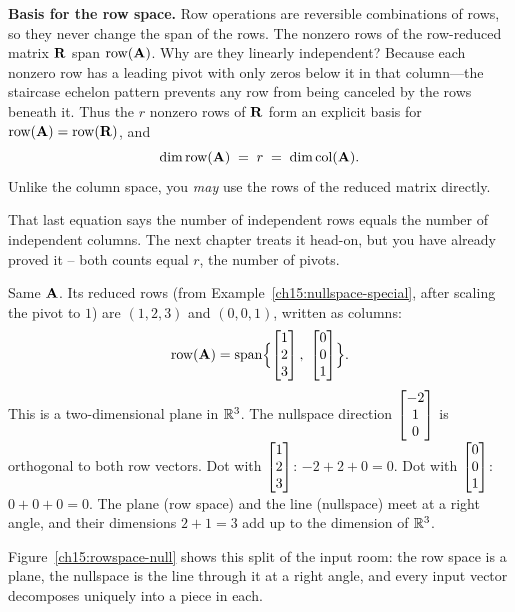 \begin{formalbox}
\textbf{Basis for the row space.} Row operations are reversible combinations of rows, so they
never change the span of the rows. The nonzero rows of the row-reduced matrix $\mat{R}$ span
$\row(\mat{A})$. Why are they linearly independent? Because each nonzero row has a leading pivot
with only zeros below it in that column---the staircase echelon pattern prevents any row from being
canceled by the rows beneath it. Thus the $r$ nonzero rows of $\mat{R}$ form an explicit basis for
$\row(\mat{A})=\row(\mat{R})$, and
\[
  \dimn \row(\mat{A}) \;=\; r \;=\; \dimn\col(\mat{A}).
\]
Unlike the column space, you \emph{may} use the rows of the reduced matrix directly.
\end{formalbox}

That last equation says the number of independent rows equals the number of
independent columns. The next chapter treats it head-on, but you have already
proved it -- both counts equal $r$, the number of pivots.

\begin{example}\label{ch15:rowspace}
Same $\mat{A}$. Its reduced rows (from Example~\ref{ch15:nullspace-special}, after scaling the
pivot to $1$) are $(1,2,3)$ and $(0,0,1)$, written as columns:
\[
  \row(\mat{A}) = \spn\set[\Big]{\colvec{1\\2\\3},\ \colvec{0\\0\\1}}.
\]
This is a two-dimensional plane in $\R^3$. The nullspace direction $\colvec{-2\\1\\0}$ is
orthogonal to both row vectors. Dot with $\colvec{1\\2\\3}$: $-2+2+0=0$. Dot with
$\colvec{0\\0\\1}$: $0+0+0=0$. The plane (row space) and the line (nullspace) meet at a
right angle, and their dimensions $2+1=3$ add up to the dimension of $\R^3$.
\end{example}

Figure~\ref{ch15:rowspace-null} shows this split of the input room: the row space is a plane, the
nullspace is the line through it at a right angle, and every input vector decomposes uniquely into a
piece in each.

